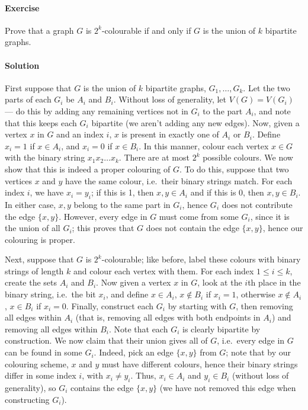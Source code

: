 \documentclass[10pt]{article}
\newcounter{prob}
\newcommand{\problem}{\stepcounter{prob}\paragraph{Exercise \arabic{prob}}}
\newcommand{\solution}{\paragraph{Solution}}
\begin{document}
    \problem Prove that a graph $G$ is $2^k$-colourable if and only if $G$ is the
    union of $k$ bipartite graphs.

    \solution First suppose that $G$ is the union of $k$ bipartite graphs, $G_1,
    \dots, G_k$. Let the two parts of each $G_i$ be $A_i$ and $B_i$. Without loss of
    generality, let $V(G) = V(G_i)$ --- do this by adding any remaining vertices not
    in $G_i$ to the part $A_i$, and note that this keeps each $G_i$ bipartite (we
    aren't adding any new edges). Now, given a vertex $x$ in $G$ and an index $i$,
    $x$ is present in exactly one of $A_i$ or $B_i$.  Define $x_i = 1$ if $x \in
    A_i$, and $x_i = 0$ if $x \in B_i$. In this manner, colour each vertex $x \in G$
    with the binary string $x_1x_2 \dots x_k$. There are at most $2^k$ possible
    colours. We now show that this is indeed a proper colouring of $G$. To do this,
    suppose that two vertices $x$ and $y$ have the same colour, i.e.\ their binary
    strings match. For each index $i$, we have $x_i = y_i$; if this is 1, then $x, y
    \in A_i$ and if this is 0, then $x, y \in B_i$. In either case, $x, y$ belong to
    the same part in $G_i$, hence $G_i$ does not contribute the edge $\{x, y\}$.
    However, every edge in $G$ must come from some $G_i$, since it is the union of
    all $G_i$; this proves that $G$ does not contain the edge $\{x, y\}$, hence our
    colouring is proper.

    Next, suppose that $G$ is $2^k$-colourable; like before, label these colours with
    binary strings of length $k$ and colour each vertex with them. For each index $1
    \leq i \leq k$, create the sets $A_i$ and $B_i$. Now given a vertex $x$ in $G$,
    look at the $i$th place in the binary string, i.e.\ the bit $x_i$, and define $x
    \in A_i$, $x \notin B_i$ if $x_i = 1$, otherwise $x \notin A_i$, $x \in B_i$ if
    $x_i = 0$. Finally, construct each $G_i$ by starting with $G$, then removing all
    edges within $A_i$ (that is, removing all edges with both endpoints in $A_i$) and
    removing all edges within $B_i$. Note that each $G_i$ is clearly bipartite by
    construction. We now claim that their union gives all of $G$, i.e.\ every edge in
    $G$ can be found in some $G_i$. Indeed, pick an edge $\{x, y\}$ from $G$; note
    that by our colouring scheme, $x$ and $y$ must have different colours, hence
    their binary strings differ in some index $i$, with $x_i \neq y_i$. Thus, $x_i
    \in A_i$ and $y_i \in B_i$ (without loss of generality), so $G_i$ contains the
    edge $\{x, y\}$ (we have not removed this edge when constructing $G_i$).
\end{document}
